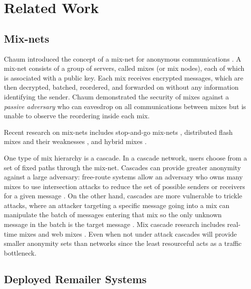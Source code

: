\documentclass[11pt]{IEEEtran}
\begin{document}

\section{Related Work}
\label{sec:related}

\subsection{Mix-nets}

Chaum introduced the concept of a mix-net for anonymous communications
\cite{chaum-mix}. A mix-net consists of a group of servers, called
mixes (or mix nodes), each of which is associated with a public
key. Each mix receives encrypted messages, which are then decrypted,
batched, reordered, and forwarded on without any information
identifying the sender. Chaum demonstrated the security of mixes
against a \emph{passive adversary} who can eavesdrop on all
communications between mixes but is unable to observe the reordering
inside each mix.

Recent research on mix-nets includes stop-and-go mix-nets
\cite{kesdogan}, distributed flash mixes \cite{flash-mix} and their
weaknesses \cite{desmedt}\cite{mitkuro}, and hybrid mixes \cite{hybrid-mix}.

One type of mix hierarchy is a cascade.
In a cascade network, users choose from a set of fixed paths through
the mix-net.
Cascades can provide greater anonymity against a large adversary:
free-route systems allow an adversary who owns many mixes to use
intersection attacks to reduce the set of possible senders or receivers
for a given
message \cite{disad-free-routes}. On the other hand, cascades are more
vulnerable \cite{batching-taxonomy} to trickle attacks, where an attacker
targeting a specific message going into a mix can manipulate the batch
of messages entering that mix so the only unknown message in the batch
is the target message \cite{mixmaster-attacks}\cite{babel}.
Mix cascade research includes real-time mixes \cite{realtime-mix} and
web mixes \cite{web-mix}. Even when not under attack cascades will
provide smaller anonymity sets than networks since the least
resourceful acts as a traffic bottleneck.

\subsection{Deployed Remailer Systems}
\end{document}
